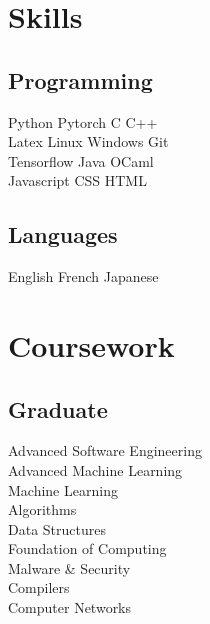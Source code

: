 \documentclass[]{deedy-resume-openfont}
\begin{document}
%
%
\lastupdated

%
%

%
%

\begin{minipage}[t]{0.29\textwidth}


\section{Skills}
\subsection{Programming}
Python \textbullet{} Pytorch \textbullet{} C \textbullet{} C++ \\
Latex \textbullet{} Linux \textbullet{} Windows \textbullet{} Git \\
Tensorflow \textbullet{} Java \textbullet{} OCaml \\
Javascript \textbullet{} CSS \textbullet{} HTML
\sectionsep

\subsection{Languages}
English \textbullet{} French \textbullet{} Japanese


\section{Coursework}
\subsection{Graduate}
Advanced Software Engineering \\
Advanced Machine Learning \\
Machine Learning \\
Algorithms \\
Data Structures \\
Foundation of Computing \\
Malware \& Security \\
Compilers \\
Computer Networks \\
\sectionsep


\end{minipage}
\end{document}
